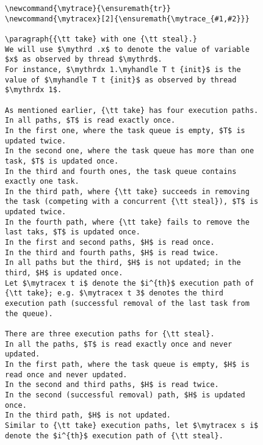 \documentclass[a4paper]{article}
\begin{document}
{\begin{figure}
\begin{lstlisting}
\newcommand{\mytrace}{\ensuremath{tr}}
\newcommand{\mytracex}[2]{\ensuremath{\mytrace_{#1,#2}}}

\paragraph{{\tt take} with one {\tt steal}.}
We will use $\mythrd .x$ to denote the value of variable $x$ as observed by thread $\mythrd$.
For instance, $\mythrdx 1.\myhandle T t {init}$ is the value of $\myhandle T t {init}$ as observed by thread $\mythrdx 1$.

As mentioned earlier, {\tt take} has four execution paths. 
In all paths, $T$ is read exactly once.
In the first one, where the task queue is empty, $T$ is updated twice. 
In the second one, where the task queue has more than one task, $T$ is updated once.
In the third and fourth ones, the task queue contains exactly one task.
In the third path, where {\tt take} succeeds in removing the task (competing with a concurrent {\tt steal}), $T$ is updated twice.
In the fourth path, where {\tt take} fails to remove the last taks, $T$ is updated once.
In the first and second paths, $H$ is read once.
In the third and fourth paths, $H$ is read twice.
In all paths but the third, $H$ is not updated; in the third, $H$ is updated once.
Let $\mytracex t i$ denote the $i^{th}$ execution path of {\tt take}; e.g. $\mytracex t 3$ denotes the third execution path (successful removal of the last task from the queue).

There are three execution paths for {\tt steal}.
In all the paths, $T$ is read exactly once and never updated.
In the first path, where the task queue is empty, $H$ is read once and never updated.
In the second and third paths, $H$ is read twice.
In the second (successful removal) path, $H$ is updated once.
In the third path, $H$ is not updated.
Similar to {\tt take} execution paths, let $\mytracex s i$ denote the $i^{th}$ execution path of {\tt steal}.


\end{lstlisting}
\end{figure}}
\end{document}
